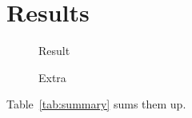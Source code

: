 \section{Results}
\begin{figure}\caption{Result}\label{fig:result}\end{figure}
\begin{figure}\caption{Extra}\label{fig:extra}\end{figure}
\begin{table}\caption{Summary}\label{tab:summary}\end{table}
Table~\ref{tab:summary} sums them up.
